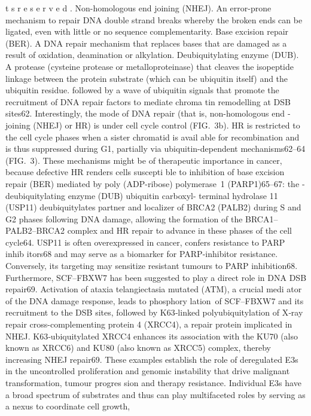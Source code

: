 t
s
 r
e
s
e
r
v
e
d
.
Non-homologous end
joining
(NHEJ). An error-prone
mechanism to repair DNA
double strand breaks whereby
the broken ends can be ligated,
even with little or no sequence
complementarity.
Base excision repair
(BER). A DNA repair
mechanism that replaces bases
that are damaged as a result of
oxidation, deamination or
alkylation.
Deubiquitylating enzyme
(DUB). A protease (cysteine
protease or metalloproteinase)
that cleaves the isopeptide
linkage between the protein
substrate (which can be
ubiquitin itself) and the
ubiquitin residue.
followed by a wave of ubiquitin signals that promote the
recruitment of DNA repair factors to mediate chroma­
tin remodelling at DSB sites62. Interestingly, the mode of
DNA repair (that is, non-homologous end ­joining (NHEJ) or
HR) is under cell cycle control (FIG. 3b). HR is restricted
to the cell cycle phases when a sister chromatid is avail­
able for recombination and is thus suppressed during G1,
partially via ubiquitin-dependent mechanisms62–64 (FIG. 3).
These mechanisms might be of therapeutic importance
in cancer, because defective HR renders cells suscepti­
ble to inhibition of base excision repair (BER) mediated
by poly (ADP-ribose) polymerase 1 (PARP1)65–67: the
­deubiquitylating enzyme (DUB) ubiquitin carboxyl-­
terminal hydrolase 11 (USP11) deubiquitylates partner
and localizer of BRCA2 (PALB2) during S and G2 phases
following DNA damage, allowing the formation of the
BRCA1–PALB2–BRCA2 complex and HR repair to
advance in these phases of the cell cycle64. USP11 is often
overexpressed in cancer, confers resistance to PARP inhib­
itors68 and may serve as a biomarker for PARP-inhibitor
resistance. Conversely, its targeting may ­sensitize resistant
tumours to PARP inhibition68.
Furthermore, SCF–FBXW7 has been suggested to
play a direct role in DNA DSB repair69. Activation of
ataxia telangiectasia mutated (ATM), a crucial medi­
ator of the DNA damage response, leads to phosphory­
lation of SCF–FBXW7 and its recruitment to the DSB
sites, followed by K63‑linked polyubiquitylation of X‑ray
repair cross-complementing protein 4 (XRCC4), a repair
protein implicated in NHEJ. K63‑ubiquitylated XRCC4
enhances its association with the KU70 (also known as
XRCC6) and KU80 (also known as XRCC5) complex,
thereby increasing NHEJ repair69.
These examples establish the role of deregulated E3s
in the uncontrolled proliferation and genomic instability
that drive malignant transformation, tumour progres­
sion and therapy resistance. Individual E3s have a broad
spectrum of substrates and thus can play multifaceted
roles by serving as a nexus to coordinate cell growth,

